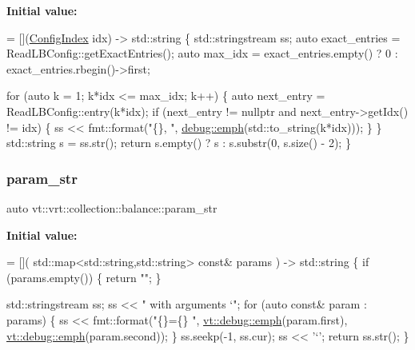 {\bfseries Initial value\+:}
\begin{DoxyCode}
= [](\hyperlink{namespacevt_1_1vrt_1_1collection_1_1balance_ac1bb9eee8129549177880dbb4e5f6a34}{ConfigIndex} idx) -> std::string \{
  std::stringstream ss;
  \textcolor{keyword}{auto} exact\_entries = ReadLBConfig::getExactEntries();
  \textcolor{keyword}{auto} max\_idx = exact\_entries.empty() ? 0 : exact\_entries.rbegin()->first;

  \textcolor{keywordflow}{for} (\textcolor{keyword}{auto} k = 1; k*idx <= max\_idx; k++) \{
    \textcolor{keyword}{auto} next\_entry = ReadLBConfig::entry(k*idx);
    \textcolor{keywordflow}{if} (next\_entry != \textcolor{keyword}{nullptr} and next\_entry->getIdx() != idx) \{
      ss << fmt::format(\textcolor{stringliteral}{"\{\}, "}, \hyperlink{namespacevt_1_1debug_add365336d7aa2053b5b7588ccad48ac7}{debug::emph}(std::to\_string(k*idx)));
    \}
  \}
  std::string s = ss.str();
  \textcolor{keywordflow}{return} s.empty() ? s : s.substr(0, s.size() - 2);
\}
\end{DoxyCode}
\mbox{\label{namespacevt_1_1vrt_1_1collection_1_1balance_aaed7e09146a45c2932ca185a55161723}} 
\subsubsection{\texorpdfstring{param\+\_\+str}{param\_str}}
{\footnotesize\ttfamily auto vt\+::vrt\+::collection\+::balance\+::param\+\_\+str}

{\bfseries Initial value\+:}
\begin{DoxyCode}
= [](
  std::map<std::string,std::string> \textcolor{keyword}{const}& params
) -> std::string \{
  \textcolor{keywordflow}{if} (params.empty()) \{
    \textcolor{keywordflow}{return} \textcolor{stringliteral}{""};
  \}

  std::stringstream ss;
  ss << \textcolor{stringliteral}{" with arguments `"};
  \textcolor{keywordflow}{for} (\textcolor{keyword}{auto} \textcolor{keyword}{const}& param : params) \{
    ss << fmt::format(\textcolor{stringliteral}{"\{\}=\{\} "},
      \hyperlink{namespacevt_1_1debug_add365336d7aa2053b5b7588ccad48ac7}{vt::debug::emph}(param.first),
      \hyperlink{namespacevt_1_1debug_add365336d7aa2053b5b7588ccad48ac7}{vt::debug::emph}(param.second));
  \}
  ss.seekp(-1, ss.cur);
  ss << \textcolor{charliteral}{'`'};
  \textcolor{keywordflow}{return} ss.str();
\}
\end{DoxyCode}
